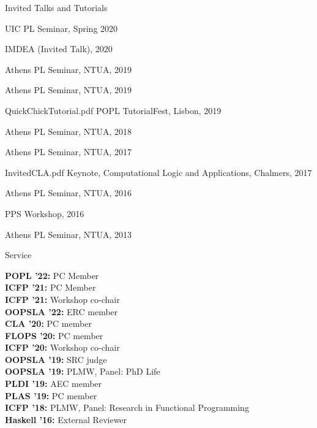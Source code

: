 \documentclass{resume} %
\begin{document}
\newcommand{\apls}[1]{Athens PL Seminar, NTUA, #1}

\begin{rSection}{Invited Talks and Tutorials}

     {}
     {UIC PL Seminar, Spring 2020}
  
     {}
     {IMDEA (Invited Talk), 2020}
  
     {}
     {Athens PL Seminar, NTUA, 2019}

    {}
    {\apls{2019}}
  
    {QuickChickTutorial.pdf}
    {POPL TutorialFest, Lisbon, 2019}

     {}
     {Athens PL Seminar, NTUA, 2018}

     {}
     {Athens PL Seminar, NTUA, 2017}

     {InvitedCLA.pdf}
     {Keynote, Computational Logic and Applications, Chalmers, 2017}

     {}
     {Athens PL Seminar, NTUA, 2016}

     {}
     {PPS Workshop, 2016}

     {}
     {Athens PL Seminar, NTUA, 2013}
     
\end{rSection}


\newcommand{\serve}[2]{
  {\bf #1:} #2 \\
  }


\begin{rSection}{Service}


  \serve{POPL '22}{PC Member}
  \serve{ICFP '21}{PC Member}
  \serve{ICFP '21}{Workshop co-chair}
  \serve{OOPSLA '22}{ERC member}
  \serve{CLA '20}{PC member}
  \serve{FLOPS '20}{PC member}
  \serve{ICFP '20}{Workshop co-chair}
  \serve{OOPSLA '19}{SRC judge}
  \serve{OOPSLA '19}{PLMW, Panel: PhD Life}
  \serve{PLDI '19}{AEC member}
  \serve{PLAS '19}{PC member}
  \serve{ICFP '18}{PLMW, Panel: Research in Functional Programming}
  \serve{Haskell '16}{External Reviewer}
  
\end{rSection}
\end{document}
